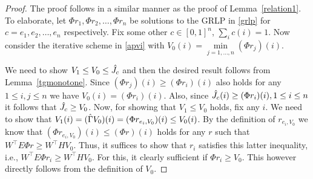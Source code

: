 \begin{proof}
The proof follows in a similar manner as the proof of Lemma~\ref{relation1}. To elaborate, let $\Phi r_1, \Phi r_2,\ldots,\Phi r_n$ be solutions to the GRLP in \eqref{grlp} for $c=e_1, e_2,\ldots,e_n$ respectively. Fix some other $c\in [0,1]^n$, $\sum_i c(i)=1$. Now consider the iterative scheme in \eqref{apvi} with $V_0(i)=\underset{j=1,\ldots,n}{\min}(\Phi r_j)(i)$.\par
We need to show $V_1\le V_0 \le \hat{J}_c$ and then the desired result follows from Lemma~\ref{tgmonotone}. Since $(\Phi r_j)(i) \ge (\Phi r_i)(i)$ also holds for any $1\leq i,j\leq n$ we have $V_0(i)  = (\Phi r_i)(i)$. Also, since $\hat{J}_c(i) \ge (\Phi r_i)(i),1\leq i \leq n$ it follows that $\hat{J}_c\geq V_0$. Now, for showing that $V_1 \le V_0$ holds, fix any $i$. We need to show that $V_1(i)=(\hat{\Gamma} V_0)(i) = (\Phi r_{e_i,V_0})(i) \leq V_0(i)$. By the definition of $r_{e_i,V_0}$ we know that $(\Phi r_{e_i,V_0})(i) \le (\Phi r)(i)$
holds for any $r$ such that $W^\top E \Phi r \ge W^\top H V_0$. Thus, it suffices to show that $r_i$ satisfies this latter inequality, i.e., $W^\top E \Phi r_i \ge W^\top H V_0$. For this, it clearly sufficient if $\Phi r_i \ge V_0$. This however directly follows from the definition of $V_0$.
\begin{comment}
It is clear from the definition of $V_0$ that $\hj(i),(\Phi r_j)(i)\geq(\Phi r_i)(i)$, $i=1,\ldots,n$.
In particular, it follows that $V_0(i) =( \Phi r_i)(i)$ and so
$\Phi r_i \geq V_0$.
From the monotone property of $T$ (viz. $H$) we have 
$H\Phi r_i\geq H V_0$ and also, by minimizing component-wise
$E\Phi r_i\geq H\Phi r_i\geq HV_0$. Thus,
$E V_0\geq H V_0$. 
\todoc[inline]{I lost why this was needed.
I think the proof would be much easier to understand if we introduced $r_{c,J} = \argmin_{r} \{ c^\top \Phi r \,:\, W^\top E \Phi r \ge W^\top H J\}$. We could start by saying we need $V_1\le V_0 \le \hj$ because then Lemma~\ref{tgmonotone} will give the desired result. Next, $V_0\le \hj$ holds because on the one hand, $\hj(i) \ge (\Phi r_i)(i)$ for any $i$, while on the other hand,
$(\Phi r_j)(i) \ge (\Phi r_i)(i)$ also holds for any $i,j$, hence $V_0(i)  = (\Phi r_i)(i)$. 
Now, for showing that $V_1 \le V_0$ holds, fix any $i$. We need to show that $(\hg V_0)(i) = \min_j (\Phi r_{e_j,V_0})(i) = (\Phi r_{e_i,V_0})(i)$ is less than $V_0(i)$. By the definition of $r_{e_j,V_0}$ we know that $(\Phi r_{e_i,V_0})(i) \le (\Phi r)(i)$
holds for any $r$ such that $W^\top E \Phi r \ge W^\top H V_0$. Thus, it suffices to show that $r_i$ satisfies this latter inequality,
i.e., $W^\top E \Phi r_i \ge W^\top H V_0$. For this, it clearly sufficient if $\Phi r_i \ge V_0$. This however directly follows 
from the definition of $V_0$.
}
Since $V_1=\hg V_0$, from the definition of $\hg$ in \eqref{gamdef} and the construction of $V_0$, we have $V_0\geq V_1$, and recursively $V_{n}\geq V_{n+1}, \mb n\geq 0$. So it follows that $\hj\geq V_0\geq V_1\ldots\geq \hv$.
\end{comment}
\end{proof}
